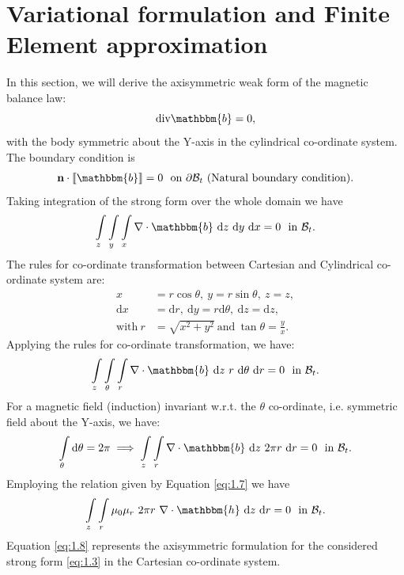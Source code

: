 \documentclass[11pt,a4paper,final]{article}
\begin{document}
\section{Variational formulation and Finite Element approximation}
In this section, we will derive the axisymmetric weak form of the magnetic balance law:
\begin{equation}
 \text{div}\mathbbm{b} = 0,
 \end{equation} 
with the body symmetric about the Y-axis in the cylindrical co-ordinate system. The boundary condition is
\begin{align}
\mathbf{n} \cdot \llbracket \mathbbm{b} \rrbracket = 0 \ \ \text{on} \ \partial\mathcal{B}_t \ (\text{Natural boundary condition}).
\label{eq:1.10}
\end{align}
Taking integration of the strong form over the whole domain we have 
\begin{equation}
\int\limits_{z} \int\limits_{y} \int\limits_{x} \nabla \cdot \mathbbm{b} \ \mathrm{d}z \ \mathrm{d}y \ \mathrm{d}x = 0 \ \ \text{in} \ \mathcal{B}_t. 
\end{equation}
The rules for co-ordinate transformation between Cartesian and Cylindrical co-ordinate system are:
\begin{align}
x &= r \cos \theta, \ y = r \sin \theta, \ z = z, \nonumber\\
\mathrm{d}x &= \mathrm{d}r, \ \mathrm{d}y = r \mathrm{d}\theta, \ \mathrm{d}z = \mathrm{d}z, \nonumber\\
\text{with} \ r &= \sqrt{x^2 + y^2} \ \text{and} \ \tan \theta = \frac{y}{x}.
\end{align}
Applying the rules for co-ordinate transformation, we have:
\begin{equation}
\int\limits_{z} \int\limits_{\theta} \int\limits_{r} \nabla \cdot \mathbbm{b} \ \mathrm{d}z \ r \ \mathrm{d}\theta \ \mathrm{d}r = 0 \ \ \text{in} \ \mathcal{B}_t.
\end{equation}
For a magnetic field (induction) invariant w.r.t. the $\theta$ co-ordinate, i.e. symmetric field about the Y-axis, we have:
\begin{align}
\int\limits_{\theta} \mathrm{d}\theta = 2 \pi \implies \int\limits_{z} \int\limits_{r} \nabla \cdot \mathbbm{b} \ \mathrm{d}z \ 2 \pi r \ \mathrm{d}r = 0 \ \ \text{in} \ \mathcal{B}_t.
\label{eq:1.6}
\end{align}
Employing the relation given by Equation \eqref{eq:1.7} we have
\begin{equation}
\int\limits_{z} \int\limits_{r} \mu_0 \mu_r \ 2 \pi r \ \nabla \cdot \mathbbm{h} \ \mathrm{d}z \ \mathrm{d}r = 0 \ \ \text{in} \ \mathcal{B}_t.
\label{eq:1.8}
\end{equation}
Equation \eqref{eq:1.8} represents the axisymmetric formulation for the considered strong form \eqref{eq:1.3} in the Cartesian co-ordinate system. \par 
\end{document}
